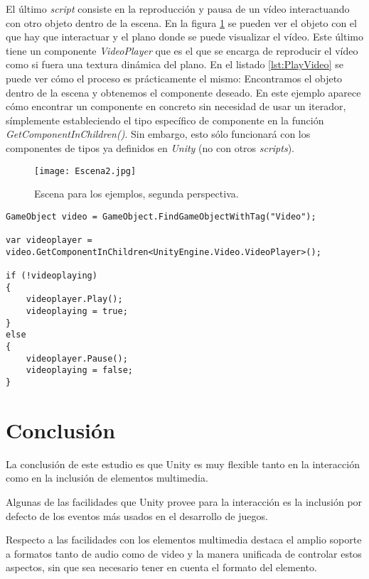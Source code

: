 \documentclass{pre-tfg}
\begin{document}
El último \textit{script} consiste en la reproducción y pausa de un vídeo interactuando con otro objeto dentro de la escena. En la figura \ref{fig:Escena2} se pueden ver el objeto con el que hay que interactuar y el plano donde se puede visualizar el vídeo. Este último tiene un componente \textit{VideoPlayer} que es el que se encarga de reproducir el vídeo como si fuera una textura dinámica del plano. En el listado \ref{lst:PlayVideo} se puede ver cómo el proceso es prácticamente el mismo: Encontramos el objeto dentro de la escena y obtenemos el componente deseado. En este ejemplo aparece cómo encontrar un componente en concreto sin necesidad de usar un iterador, símplemente estableciendo el tipo específico de componente en la función \textit{GetComponentInChildren()}. Sin embargo, esto sólo funcionará con los componentes de tipos ya definidos en \textit{Unity} (no con otros \textit{scripts}). 

\begin{figure}[htb]
	\centering
	\texttt{[image: Escena2.jpg]}
	\caption{Escena para los ejemplos, segunda perspectiva.}
	\label{fig:Escena2}
\end{figure}

\begin{spacing}{1}
\begin{lstlisting}[float=htbp, caption=Inicio y pausa del vídeo desde el objeto con el que se interactúa, label=lst:PlayVideo]
GameObject video = GameObject.FindGameObjectWithTag("Video");

var videoplayer = video.GetComponentInChildren<UnityEngine.Video.VideoPlayer>();

if (!videoplaying)
{
	videoplayer.Play();
	videoplaying = true;
}
else
{
	videoplayer.Pause();
	videoplaying = false;
}
\end{lstlisting}
\end{spacing}

\section{Conclusión}

La conclusión de este estudio es que Unity es muy flexible tanto en la interacción como en la inclusión de elementos multimedia. 

Algunas de las facilidades que Unity provee para la interacción es la inclusión por defecto de los eventos más usados en el desarrollo de juegos.

Respecto a las facilidades con los elementos multimedia destaca el amplio soporte a formatos tanto de audio como de video y la manera unificada de controlar estos aspectos, sin que sea necesario tener en cuenta el formato del elemento.

\clearpage


\nocite{*}
\printbibliography
\end{document}
